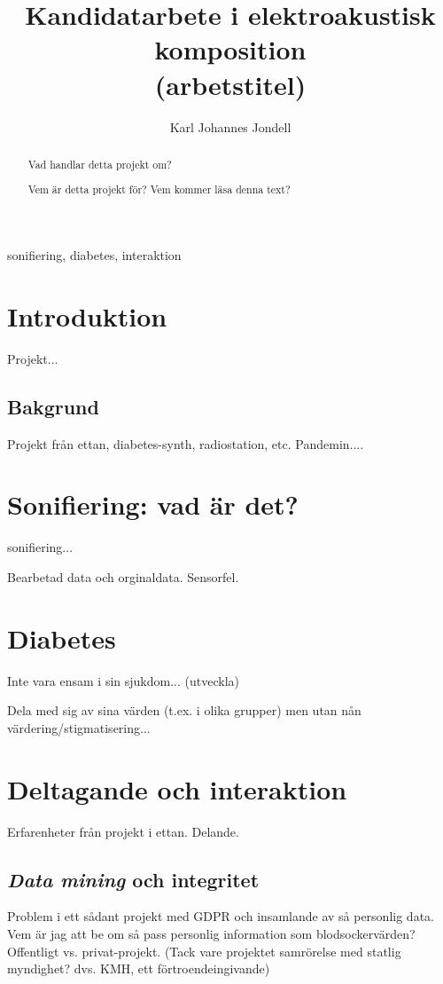 \documentclass[12pt]{article}
\begin{document}
\title{Kandidatarbete i elektroakustisk komposition\\(arbetstitel)}
\author{Karl Johannes Jondell}

\maketitle

\begin{abstract}
Vad handlar detta projekt om?

Vem är detta projekt för? Vem kommer läsa denna text? 
\end{abstract}

\begin{keyword}
sonifiering, diabetes, interaktion
\end{keyword}

\tableofcontents

\section{Introduktion}
Projekt...

\subsection{Bakgrund}
Projekt från ettan, diabetes-synth, radiostation, etc.
Pandemin....

\section{Sonifiering: vad är det?}
sonifiering... \cite{bijsterveld_sonic_2019}

Bearbetad data och orginaldata. Sensorfel.

\section{Diabetes}
Inte vara ensam i sin sjukdom... (utveckla)

Dela med sig av sina värden (t.ex. i olika grupper) men utan nån värdering/stigmatisering...

\section{Deltagande och interaktion}
Erfarenheter från projekt i ettan. Delande.

\subsection{\emph{Data mining} och integritet}
Problem i ett sådant projekt med GDPR och insamlande av så personlig data. Vem är jag att be om så pass personlig information som blodsockervärden? Offentligt vs. privat-projekt. (Tack vare projektet samrörelse med statlig myndighet? dvs. KMH, ett förtroendeingivande)
\end{document}
